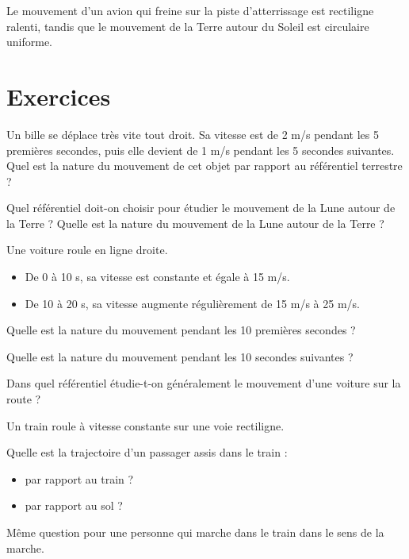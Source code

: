 \documentclass[12pt]{article}
\begin{document}
\begin{exemple}{}{}
    Le mouvement d'un avion qui freine sur la piste d'atterrissage est rectiligne ralenti, tandis que le mouvement de la Terre autour du Soleil est circulaire uniforme.
\end{exemple}

\section{Exercices}
\begin{exercice}{}{}
    Un bille se déplace très vite tout droit. Sa vitesse est de 2 m/s pendant les 5 premières secondes, puis elle devient de 1 m/s pendant les 5 secondes suivantes. Quel est la nature du mouvement de cet objet par rapport au référentiel terrestre ?
\end{exercice}

\begin{exercice}{}{}
    Quel référentiel doit-on choisir pour étudier le mouvement de la Lune autour de la Terre ? Quelle est la nature du mouvement de la Lune autour de la Terre ? 
\end{exercice}

\begin{exercice}{}{}
    Une voiture roule en ligne droite.
    \begin{itemize}
        \item De 0 à 10 s, sa vitesse est constante et égale à 15 m/s.
        \item De 10 à 20 s, sa vitesse augmente régulièrement de 15 m/s à 25 m/s.
    \end{itemize}
    
    \begin{enumeratebf}
        \item Quelle est la nature du mouvement pendant les 10 premières secondes ?
        \item Quelle est la nature du mouvement pendant les 10 secondes suivantes ?
        \item Dans quel référentiel étudie-t-on généralement le mouvement d’une voiture sur la route ?
    \end{enumeratebf}
\end{exercice}

\begin{exercice}{}{}
    Un train roule à vitesse constante sur une voie rectiligne.
    
    \begin{enumeratebf}
        \item Quelle est la trajectoire d’un passager assis dans le train :
        \begin{itemize}
            \item par rapport au train ?
            \item par rapport au sol ?
        \end{itemize}
        
        \item Même question pour une personne qui marche dans le train dans le sens de la marche.
    \end{enumeratebf}
\end{exercice}
\end{document}
